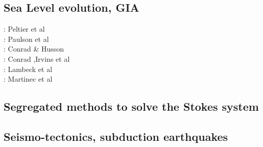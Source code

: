 \subsection{Sea Level evolution, GIA}

\begin{scriptsize}
\nineteenseventyeight: Peltier et al \cite{pefc78}\\
\twothousandseven: Paulson et al \cite{pazw07}\\
\twothousandnine: Conrad \& Husson \cite{cohu09}\\
\twothousandthirteen: Conrad \cite{conr13},Irvins et al \cite{ivjw13}\\
\twothousandfourteen: Lambeck et al \cite{larp14}\\
\twothousandeighteen: Martinec et al \cite{makv18}
\end{scriptsize}

\subsection{Segregated methods to solve the Stokes system}

\begin{scriptsize}
\cite{raju91}
\cite{haeh93}
\cite{leru95}
\cite{duto98}
\cite{wade03}
\cite{wade04}
\cite{utne08}
\end{scriptsize}

\subsection{Seismo-tectonics, subduction earthquakes}

